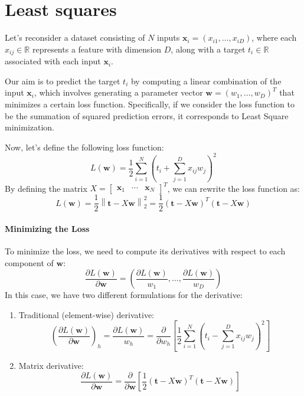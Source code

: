 \section{Least squares}

Let's reconsider a dataset consisting of $N$ inputs $\textbf{x}_i=(x_{i1}, \dots, x_{iD})$, where each $x_{ij} \in\mathbb{R}$ represents a feature with dimension $D$, along with a target $t_i \in \mathbb{R}$ associated with each input $\textbf{x}_i$. 

Our aim is to predict the target $t_i$ by computing a linear combination of the input $\textbf{x}_i$, which involves generating a parameter vector $\textbf{w}= {(w_1, \dots, w_D)}^T$ that minimizes a certain loss function.
Specifically, if we consider the loss function to be the summation of squared prediction errors, it corresponds to Least Square minimization.

Now, let's define the following loss function:
\[L(\textbf{w})=\dfrac{1}{2}\sum_{i=1}^{N}{\left(t_i+\sum_{j=1}^{D}x_{ij}w_j\right)}^2\]
By defining the matrix $X=\begin{bmatrix} \textbf{x}_1 & \cdots & \textbf{x}_N \end{bmatrix}^T$, we can rewrite the loss function as:
\[L(\textbf{w})=\dfrac{1}{2}\left\lVert \textbf{t}-X\textbf{w}\right\rVert_2^2=\dfrac{1}{2}{\left(\textbf{t}-X\textbf{w}\right)}^T\left(\textbf{t}-X\textbf{w}\right)\]

\paragraph*{Minimizing the Loss}
To minimize the loss, we need to compute its derivatives with respect to each component of $\textbf{w}$:
\[\dfrac{\partial L(\textbf{w})}{\partial\textbf{w}}=\left(\dfrac{\partial L(\textbf{w})}{w_1},\ldots,\dfrac{\partial L(\textbf{w})}{w_D}\right)\]
In this case, we have two different formulations for the derivative:
\begin{enumerate}
    \item Traditional (element-wise) derivative:
        \[{\left(\dfrac{\partial L(\textbf{w})}{\partial\textbf{w}}\right)}_h=\dfrac{\partial L(\textbf{w})}{w_h}=\dfrac{\partial}{\partial w_h}\left[ \dfrac{1}{2}\sum_{i=1}^{N}{\left(t_i-\sum_{j=1}^{D}x_{ij}w_j\right)}^2 \right]\]
    \item Matrix derivative: 
        \[\dfrac{\partial L(\textbf{w})}{\partial\textbf{w}}=\dfrac{\partial}{\partial\textbf{w}}\left[\dfrac{1}{2}{\left(\textbf{t}-X\textbf{w}\right)}^T\left(\textbf{t}-X\textbf{w}\right)\right]\]
\end{enumerate}